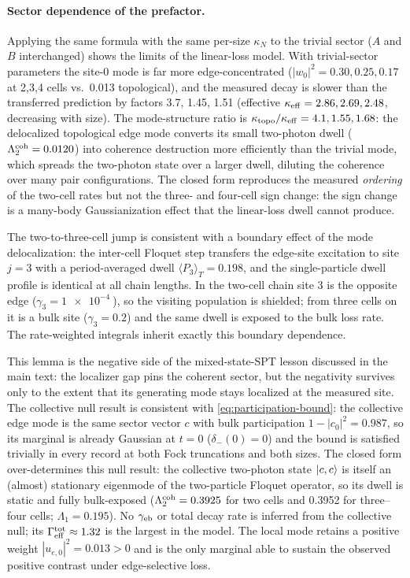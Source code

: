 \documentclass[aps,pra,preprint,superscriptaddress,amsmath,amssymb]{revtex4-2}
\begin{document}
\paragraph{Sector dependence of the prefactor.}
Applying the same formula with the same per-size $\kappa_N$ to the trivial sector ($A$ and $B$ interchanged) shows the limits of the linear-loss model. With trivial-sector parameters the site-\num{0} mode is far more edge-concentrated ($|w_0|^2=\num{0.30},\num{0.25},\num{0.17}$ at \num{2},\num{3},\num{4} cells vs.\ \num{0.013} topological), and the measured decay is slower than the transferred prediction by factors \num{3.7}, \num{1.45}, \num{1.51} (effective $\kappa_{\rm eff}=\num{2.86},\num{2.69},\num{2.48}$, decreasing with size). The mode-structure ratio is $\kappa_{\rm topo}/\kappa_{\rm eff}=\num{4.1},\num{1.55},\num{1.68}$: the delocalized topological edge mode converts its small two-photon dwell ($\Lambda_2^{\rm coh}=\num{0.0120}$) into coherence destruction more efficiently than the trivial mode, which spreads the two-photon state over a larger dwell, diluting the coherence over many pair configurations. The closed form reproduces the measured \emph{ordering} of the two-cell rates but not the three- and four-cell sign change: the sign change is a many-body Gaussianization effect that the linear-loss dwell cannot produce.

The two-to-three-cell jump is consistent with a boundary effect of the mode delocalization: the inter-cell Floquet step transfers the edge-site excitation to site $j=\num{3}$ with a period-averaged dwell $\langle P_3\rangle_T=\num{0.198}$, and the single-particle dwell profile is identical at all chain lengths. In the two-cell chain site \num{3} is the opposite edge ($\gamma_3=\qty{1e-4}{}$), so the visiting population is shielded; from three cells on it is a bulk site ($\gamma_3=\num{0.2}$) and the same dwell is exposed to the bulk loss rate. The rate-weighted integrals inherit exactly this boundary dependence.

This lemma is the negative side of the mixed-state-SPT lesson discussed in the main text: the localizer gap pins the coherent sector, but the negativity survives only to the extent that its generating mode stays localized at the measured site. The collective null result is consistent with \cref{eq:participation-bound}: the collective edge mode is the same sector vector $c$ with bulk participation $1-|c_0|^2=\num{0.987}$, so its marginal is already Gaussian at $t=\num{0}$ ($\delta_-(0)=\num{0}$) and the bound is satisfied trivially in every record at both Fock truncations and both sizes. The closed form over-determines this null result: the collective two-photon state $\ket{c,c}$ is itself an (almost) stationary eigenmode of the two-particle Floquet operator, so its dwell is static and fully bulk-exposed ($\Lambda_2^{\rm coh}=\num{0.3925}$ for two cells and \num{0.3952} for three--four cells; $\Lambda_1=\num{0.195}$). No $\gamma_{\rm eb}$ or total decay rate is inferred from the collective null; its $\Gamma_{\rm eff}^{\rm tot}\approx\num{1.32}$ is the largest in the model. The local mode retains a positive weight $|u_{e,0}|^2=\num{0.013}>0$ and is the only marginal able to sustain the observed positive contrast under edge-selective loss.
\end{document}

